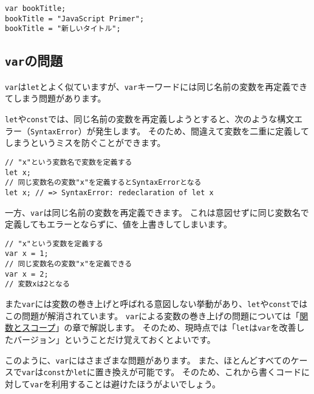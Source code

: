 \begin{lstlisting}
var bookTitle;
bookTitle = "JavaScript Primer";
bookTitle = "新しいタイトル";
\end{lstlisting}

\hypertarget{var-issues}{%
\subsection{\texorpdfstring{\texttt{var}の問題}{varの問題}}\label{var-issues}}

\texttt{var}は\texttt{let}とよく似ていますが、\texttt{var}キーワードには同じ名前の変数を再定義できてしまう問題があります。

\texttt{let}や\texttt{const}では、同じ名前の変数を再定義しようとすると、次のような構文エラー（\texttt{SyntaxError}）が発生します。
そのため、間違えて変数を二重に定義してしまうというミスを防ぐことができます。

\begin{lstlisting}
// "x"という変数名で変数を定義する
let x;
// 同じ変数名の変数"x"を定義するとSyntaxErrorとなる
let x; // => SyntaxError: redeclaration of let x
\end{lstlisting}

一方、\texttt{var}は同じ名前の変数を再定義できます。
これは意図せずに同じ変数名で定義してもエラーとならずに、値を上書きしてしまいます。

\begin{lstlisting}
// "x"という変数を定義する
var x = 1;
// 同じ変数名の変数"x"を定義できる
var x = 2;
// 変数xは2となる
\end{lstlisting}

また\texttt{var}には変数の巻き上げと呼ばれる意図しない挙動があり、\texttt{let}や\texttt{const}ではこの問題が解消されています。
\texttt{var}による変数の巻き上げの問題については「\hyperlink{function-and-scope}{関数とスコープ}」の章で解説します。
そのため、現時点では「\texttt{let}は\texttt{var}を改善したバージョン」ということだけ覚えておくとよいです。

このように、\texttt{var}にはさまざまな問題があります。
また、ほとんどすべてのケースで\texttt{var}は\texttt{const}か\texttt{let}に置き換えが可能です。
そのため、これから書くコードに対して\texttt{var}を利用することは避けたほうがよいでしょう。

